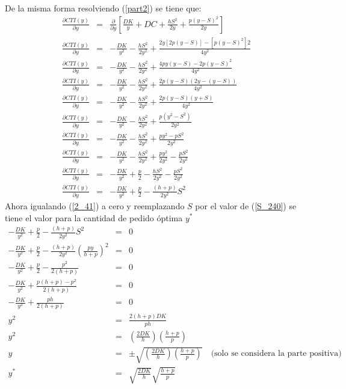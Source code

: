 De la misma forma resolviendo (\ref{part2}) se tiene que:
\begin{eqnarray}
	\label{2_41}
	\frac{\partial CTI(y)}{\partial y} &=& \frac{\partial}{\partial y} \left[ \frac{DK}{y} + DC + \frac{hS^2}{2y}+\frac{p{(y-S)}^{2}}{2y} \right] \nonumber \\
	\frac{\partial CTI(y)}{\partial y} &=& - \frac{DK}{y^2} - \frac{hS^2}{2y^2} + \frac{2y[2p(y-S)]-[p{(y-S)}^{2}]2}{4y^2} \nonumber \\
	\frac{\partial CTI(y)}{\partial y} &=& - \frac{DK}{y^2} - \frac{hS^2}{2y^2} + \frac{4py(y-S)-2p{(y-S)}^{2}}{4y^2} \nonumber \\
	\frac{\partial CTI(y)}{\partial y} &=& - \frac{DK}{y^2} - \frac{hS^2}{2y^2} + \frac{2p(y-S)(2y-(y-S))}{4y^2} \nonumber \\
	\frac{\partial CTI(y)}{\partial y} &=& - \frac{DK}{y^2} - \frac{hS^2}{2y^2} + \frac{2p(y-S)(y+S)}{4y^2} \nonumber \\
	\frac{\partial CTI(y)}{\partial y} &=& - \frac{DK}{y^2} - \frac{hS^2}{2y^2} + \frac{p(y^2 - S^2)}{2y^2} \nonumber \\
	\frac{\partial CTI(y)}{\partial y} &=& - \frac{DK}{y^2} - \frac{hS^2}{2y^2} + \frac{py^2 - pS^2}{2y^2} \nonumber \\
	\frac{\partial CTI(y)}{\partial y} &=& - \frac{DK}{y^2} - \frac{hS^2}{2y^2} + \frac{py^2}{2y^2} - \frac{pS^2}{2y^2} \nonumber \\
	\frac{\partial CTI(y)}{\partial y} &=& - \frac{DK}{y^2} + \frac{p}{2} - \frac{hS^2}{2y^2} - \frac{pS^2}{2y^2} \nonumber \\
	\frac{\partial CTI(y)}{\partial y} &=& - \frac{DK}{y^2} + \frac{p}{2} - \frac{(h + p)}{2y^2}S^2
\end{eqnarray}
Ahora igualando (\ref{2_41}) a cero y reemplazando $S$ por el valor de (\ref{S_240})  se tiene el valor para la cantidad de pedido óptima $y^*$
\newpage
\begin{eqnarray}
		\label{y_ast}
	 	- \frac{DK}{y^2} + \frac{p}{2} - \frac{(h + p)}{2y^2}S^2 &=& 0 \nonumber \\
	 	- \frac{DK}{y^2} + \frac{p}{2} - \frac{(h + p)}{2y^2} {\left(\frac{py}{h+p} \right)}^{2} &=& 0 \nonumber \\
	 	- \frac{DK}{y^2} + \frac{p}{2} - \frac{p^2}{2(h+p)} &=& 0 \nonumber \\
	 	- \frac{DK}{y^2} + \frac{p(h+p)-p^2}{2(h+p)} &=& 0 \nonumber \\
	 	- \frac{DK}{y^2} + \frac{ph}{2(h+p)} &=& 0 \nonumber \\
	 	y^2 &=& \frac{2(h+p)DK}{ph} \nonumber \\
	 	y^2 &=& \left( \frac{2DK}{h} \right) \left( \frac{h+p}{p} \right) \nonumber \\
	 	y &=& \pm \sqrt{\left( \frac{2DK}{h} \right) \left( \frac{h+p}{p} \right)} \quad \text{(solo se considera la parte positiva)} \nonumber \\
	 	y^* &=& \sqrt{\frac{2DK}{h}} \sqrt{\frac{h+p}{p}}
\end{eqnarray}
